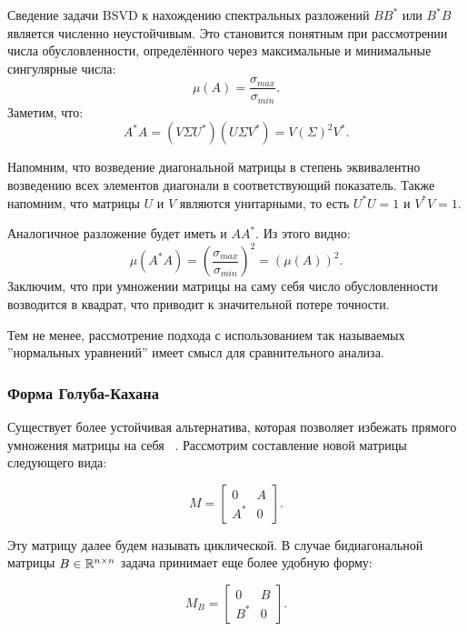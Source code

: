 
Сведение задачи BSVD к нахождению спектральных разложений \( B B^* \) или \( B^* B \) является численно неустойчивым. Это становится понятным при рассмотрении числа обусловленности, определённого через максимальные и минимальные сингулярные числа:
\[\mu(A) = \frac{\sigma_{max}}{\sigma_{min}}.\]
Заметим, что:
\[ A^*A=(V \Sigma U^*)(U \Sigma V^*)=V (\Sigma)^2V^*. \]

\begin{note}
    Напомним, что возведение диагональной матрицы в степень эквивалентно возведению всех элементов диагонали в соответствующий показатель. Также напомним, что матрицы \(U\) и \(V\) являются унитарными, то есть \(U^*U=1\) и \(V^*V=1\).
\end{note}

Аналогичное разложение будет иметь и \(AA^*\). Из этого видно:
\[ \mu(A^*A) = \left( \frac{\sigma_{max}}{\sigma_{min}} \right)^2 = (\mu(A))^2.\]
Заключим, что при умножении матрицы на саму себя число обусловленности возводится в квадрат, что приводит к значительной потере точности. 

Тем не менее, рассмотрение подхода с использованием так называемых ''нормальных уравнений'' имеет смысл для сравнительного анализа.

\subsubsection{Форма Голуба-Кахана}


Существует более устойчивая альтернатива, которая позволяет избежать прямого умножения матрицы на себя ~\cite{mr3_algo4triagonal_sym_eigen_and_bidiagSVD}. Рассмотрим составление новой матрицы следующего вида:

\begin{equation}
M = \begin{bmatrix} 0 & A \\ A^* & 0 \end{bmatrix}.
\end{equation}

Эту матрицу далее будем называть циклической. В случае бидиагональной матрицы \( B \in \mathbb{R}^{n \times n} \) задача принимает еще более удобную форму:

\begin{equation}
M_B = \begin{bmatrix} 0 & B \\ B^* & 0 \end{bmatrix}.
\end{equation}

